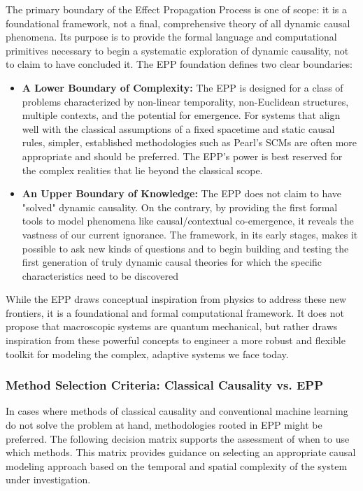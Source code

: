 The primary boundary of the Effect Propagation Process is one of scope: it is a foundational framework, not a final, comprehensive theory of all dynamic causal phenomena. 
Its purpose is to provide the formal language and computational primitives necessary to begin a systematic exploration of dynamic causality, not to claim to have concluded it. 
The EPP foundation defines two clear boundaries:


\begin{itemize}
    \item \textbf{A Lower Boundary of Complexity:} The EPP is designed for a class of problems characterized by
    non-linear temporality, non-Euclidean structures, multiple contexts, and the potential for emergence. For systems
    that align well with the classical assumptions of a fixed spacetime and static causal rules, simpler, established
    methodologies such as Pearl's SCMs are often more appropriate and should be preferred. The EPP's power is best
    reserved for the complex realities that lie beyond the classical scope.

    \item \textbf{An Upper Boundary of Knowledge:} The EPP does not claim to have "solved" dynamic causality. On the
    contrary, by providing the first formal tools to model phenomena like causal/contextual co-emergence, it reveals
    the vastness of our current ignorance. The framework, in its early stages, makes it possible to ask new kinds of
    questions and to begin building and testing the first generation of truly dynamic causal theories for which the 
    specific characteristics need to be discovered
\end{itemize}

While the EPP draws conceptual inspiration from physics to address these new frontiers, it is a foundational and formal computational
framework. It does not propose that macroscopic systems are quantum mechanical, but rather draws inspiration from these powerful
concepts to engineer a more robust and flexible toolkit for modeling the complex, adaptive systems we face today.

\subsubsection{Method Selection Criteria: Classical Causality vs. EPP}

In cases where methods of classical causality and conventional machine learning do not solve the problem at hand, methodologies rooted in EPP might be preferred. The following decision matrix supports the assessment of when to use which methods. This matrix provides guidance on selecting an appropriate causal modeling approach based on the temporal and spatial complexity of the system under investigation.

